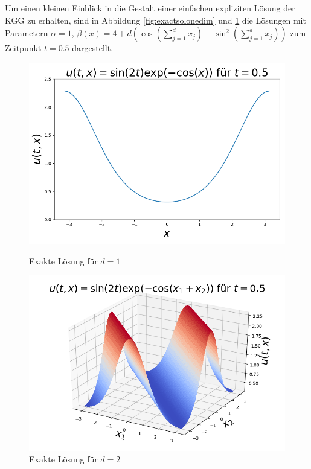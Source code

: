 Um einen kleinen Einblick in die Gestalt einer einfachen expliziten Lösung der KGG zu erhalten, sind in Abbildung \ref{fig:exactsolonedim} und \ref{fig:exactsoltwodim} die Lösungen mit Parametern $\alpha=1$, $\beta(x)=4+d(\cos(\sum_{j=1}^dx_j)+\sin^2(\sum_{j=1}^dx_j))$ zum Zeitpunkt $t=0.5$ dargestellt.
\begin{figure}[!htb]
  \includegraphics[width=\linewidth]{Figures/kgg_exact_solution_example1d.png}
  \caption{Exakte Lösung für $d=1$}
  \label{fig:exactsolonedim}
\endminipage
{}
  \includegraphics[width=\linewidth]{Figures/kgg_exact_solution_example2d.png}
  \caption{Exakte Lösung für $d=2$}
  \label{fig:exactsoltwodim}
\endminipage
\captionsetup{labelformat=empty}
\end{figure}


